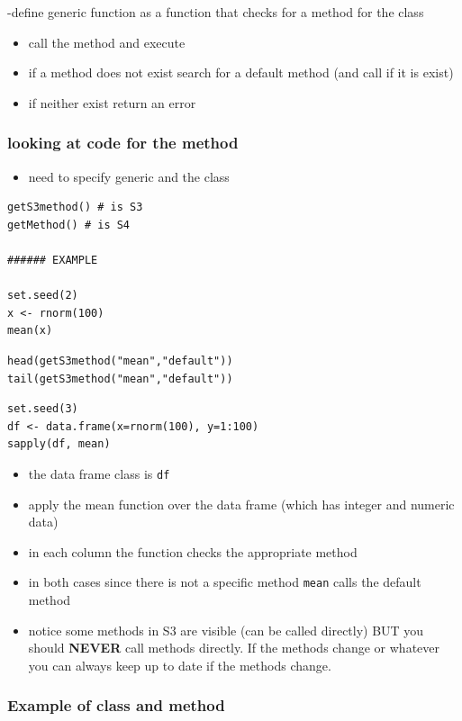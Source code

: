 \documentclass[11pt]{article}
\begin{document}
-define generic function as a function that checks for a method for
the class
\begin{itemize}
\item call the method and execute
\item if a method does not exist search for a default method (and call if
  it is exist)
\item if neither exist return an error
\end{itemize}
\subsubsection{looking at code for the method}
\label{sec-4-3-6}


\begin{itemize}
\item need to specify generic and the class
\end{itemize}


\begin{verbatim}
getS3method() # is S3
getMethod() # is S4

###### EXAMPLE

set.seed(2)
x <- rnorm(100)
mean(x)
\end{verbatim}


\begin{verbatim}
head(getS3method("mean","default"))
tail(getS3method("mean","default"))
\end{verbatim}


\begin{verbatim}
set.seed(3)
df <- data.frame(x=rnorm(100), y=1:100)
sapply(df, mean)
\end{verbatim}

\begin{itemize}
\item the data frame class is \texttt{df}
\item apply the mean function over the data frame (which has integer and
  numeric data)
\item in each column the function checks the appropriate method
\item in both cases since there is not a specific method \texttt{mean} calls the
  default method
\item notice some methods in S3 are visible (can be called directly) BUT you
  should \textbf{NEVER} call methods directly. If the methods change or
  whatever you can always keep up to date if the methods change.
\end{itemize}
\subsubsection{Example of class and method}
\label{sec-4-3-7}
\end{document}
